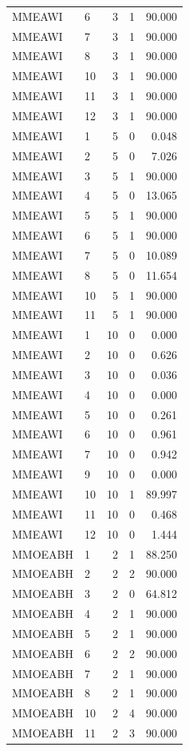 \begin{longtable}{llrrr}
MMEAWI & 6 & 3 & 1 & 90.000 \\
MMEAWI & 7 & 3 & 1 & 90.000 \\
MMEAWI & 8 & 3 & 1 & 90.000 \\
MMEAWI & 10 & 3 & 1 & 90.000 \\
MMEAWI & 11 & 3 & 1 & 90.000 \\
MMEAWI & 12 & 3 & 1 & 90.000 \\
MMEAWI & 1 & 5 & 0 & 0.048 \\
MMEAWI & 2 & 5 & 0 & 7.026 \\
MMEAWI & 3 & 5 & 1 & 90.000 \\
MMEAWI & 4 & 5 & 0 & 13.065 \\
MMEAWI & 5 & 5 & 1 & 90.000 \\
MMEAWI & 6 & 5 & 1 & 90.000 \\
MMEAWI & 7 & 5 & 0 & 10.089 \\
MMEAWI & 8 & 5 & 0 & 11.654 \\
MMEAWI & 10 & 5 & 1 & 90.000 \\
MMEAWI & 11 & 5 & 1 & 90.000 \\
MMEAWI & 1 & 10 & 0 & 0.000 \\
MMEAWI & 2 & 10 & 0 & 0.626 \\
MMEAWI & 3 & 10 & 0 & 0.036 \\
MMEAWI & 4 & 10 & 0 & 0.000 \\
MMEAWI & 5 & 10 & 0 & 0.261 \\
MMEAWI & 6 & 10 & 0 & 0.961 \\
MMEAWI & 7 & 10 & 0 & 0.942 \\
MMEAWI & 9 & 10 & 0 & 0.000 \\
MMEAWI & 10 & 10 & 1 & 89.997 \\
MMEAWI & 11 & 10 & 0 & 0.468 \\
MMEAWI & 12 & 10 & 0 & 1.444 \\
MMOEABH & 1 & 2 & 1 & 88.250 \\
MMOEABH & 2 & 2 & 2 & 90.000 \\
MMOEABH & 3 & 2 & 0 & 64.812 \\
MMOEABH & 4 & 2 & 1 & 90.000 \\
MMOEABH & 5 & 2 & 1 & 90.000 \\
MMOEABH & 6 & 2 & 2 & 90.000 \\
MMOEABH & 7 & 2 & 1 & 90.000 \\
MMOEABH & 8 & 2 & 1 & 90.000 \\
MMOEABH & 10 & 2 & 4 & 90.000 \\
MMOEABH & 11 & 2 & 3 & 90.000 \\

\end{longtable}
